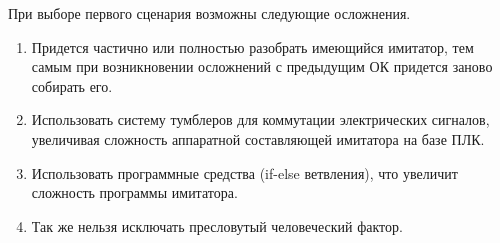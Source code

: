 При выборе первого сценария возможны следующие осложнения.
\begin{enumerate}
    \item Придется частично или полностью разобрать имеющийся имитатор, тем самым при возникновении 
        осложнений с предыдущим ОК придется заново собирать его.
    \item Использовать систему тумблеров для коммутации электрических сигналов,
        увеличивая сложность аппаратной составляющей имитатора на базе ПЛК.
    \item Использовать программные средства (if-else ветвления), что увеличит сложность программы имитатора.
    \item Так же нельзя исключать пресловутый человеческий фактор.
\end{enumerate}

